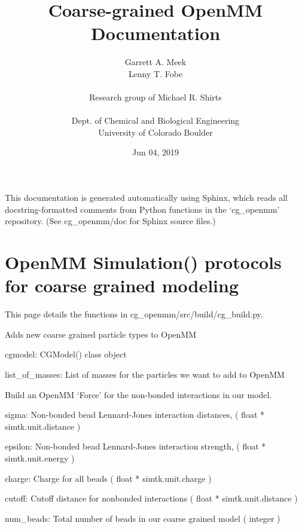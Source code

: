 \documentclass[letterpaper,12pt,english,openany,oneside]{sphinxmanual}
\title{Coarse-grained OpenMM Documentation}
\date{Jun 04, 2019}
\author{Garrett A. Meek\\Lenny T. Fobe\\ \\Research group of Michael R. Shirts\\ \\Dept. of Chemical and Biological Engineering\\University of Colorado Boulder}
\begin{document}
\pagestyle{empty}
\sphinxmaketitle
\pagestyle{plain}
\sphinxtableofcontents
\pagestyle{normal}
\label{\detokenize{index::doc}}


This documentation is generated automatically using Sphinx, which reads all docstring-formatted comments from Python functions in the ‘cg\_openmm’ repository.  (See cg\_openmm/doc for Sphinx source files.)


\chapter{OpenMM Simulation() protocols for coarse grained modeling}
\label{\detokenize{build:openmm-simulation-protocols-for-coarse-grained-modeling}}\label{\detokenize{build::doc}}
This page details the functions in cg\_openmm/src/build/cg\_build.py.

\label{\detokenize{build:module-build.cg_build}}

\begin{fulllineitems}
\label{\detokenize{build:build.cg_build.add_new_elements}}
Adds new coarse grained particle types to OpenMM

cgmodel: CGModel() class object

list\_of\_masses: List of masses for the particles we want to add to OpenMM

\end{fulllineitems}


\begin{fulllineitems}
\label{\detokenize{build:build.cg_build.build_mm_force}}
Build an OpenMM ‘Force’ for the non-bonded interactions in our model.

sigma: Non-bonded bead Lennard-Jones interaction distances,
( float * simtk.unit.distance )

epsilon: Non-bonded bead Lennard-Jones interaction strength,
( float * simtk.unit.energy )

charge: Charge for all beads
( float * simtk.unit.charge )

cutoff: Cutoff distance for nonbonded interactions
( float * simtk.unit.distance )

num\_beads: Total number of beads in our coarse grained model
( integer )

\end{fulllineitems}
\end{document}
